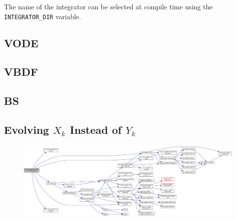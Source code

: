 The name of the integrator can be selected at compile time using 
the {\tt INTEGRATOR\_DIR} variable.

\subsection{VODE}
\label{sec:VODE}

\subsection{VBDF}
\label{sec:VBDF}

\subsection{BS}
\label{sec:BS}


\subsection{Evolving $X_k$ Instead of $Y_k$}

\begin{figure}
\centering
\includegraphics[width=\linewidth]{doxygen_network}
\end{figure}
